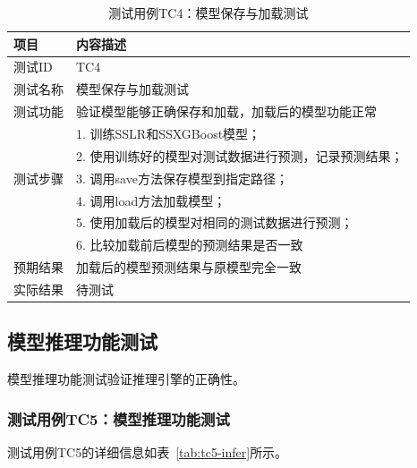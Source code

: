 \begin{table}[htbp]
    \centering
    \caption{测试用例TC4：模型保存与加载测试}
    \label{tab:tc4-persistence}
    \begin{tabular}{lp{9cm}}
        \toprule
        \textbf{项目} & \textbf{内容描述} \\
        \midrule
        测试ID & TC4 \\
        测试名称 & 模型保存与加载测试 \\
        测试功能 & 验证模型能够正确保存和加载，加载后的模型功能正常 \\
        \midrule
        \multirow{5}{*}{测试步骤} & 1. 训练SSLR和SSXGBoost模型； \\
        & 2. 使用训练好的模型对测试数据进行预测，记录预测结果； \\
        & 3. 调用save方法保存模型到指定路径； \\
        & 4. 调用load方法加载模型； \\
        & 5. 使用加载后的模型对相同的测试数据进行预测； \\
        & 6. 比较加载前后模型的预测结果是否一致 \\
        \midrule
        预期结果 & 加载后的模型预测结果与原模型完全一致 \\
        实际结果 & 待测试 \\
        \bottomrule
    \end{tabular}
\end{table}

\subsection{模型推理功能测试}

模型推理功能测试验证推理引擎的正确性。

\subsubsection{测试用例TC5：模型推理功能测试}

测试用例TC5的详细信息如表~\ref{tab:tc5-infer}所示。

